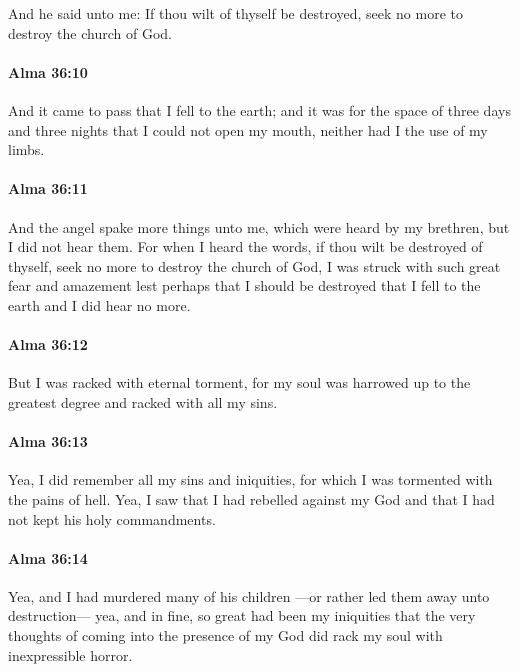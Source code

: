 			And he said unto me:
			If thou wilt of thyself be destroyed,
			seek no more to destroy the church of God.

		\paragraph{Alma 36:10} %
			\label{ALMA-36-10}

			And it came to pass that I fell to the earth;
			and it was for the space of three days and three nights
			that I could not open my mouth,
			neither had I the use of my limbs.

		\paragraph{Alma 36:11} %
			\label{ALMA-36-11}

			And the angel spake more things unto me,
			which were heard by my brethren,
			but I did not hear them.
			For when I heard the words,
			if thou wilt be destroyed of thyself,
			seek no more to destroy the church of God,
			I was struck with such great fear and amazement
			lest perhaps that I should be destroyed
			that I fell to the earth and I did hear no more.

		\paragraph{Alma 36:12} %
			\label{ALMA-36-12}

			But I was racked with eternal torment,
			for my soul was harrowed up to the greatest degree
			and racked with all my sins.

		\paragraph{Alma 36:13} %
			\label{ALMA-36-13}

			Yea, I did remember all my sins and iniquities,
			for which I was tormented with the pains of hell.
			Yea, I saw that I had rebelled against my God
			and that I had not kept his holy commandments.

		\paragraph{Alma 36:14} %
			\label{ALMA-36-14}

			Yea, and I had murdered many of his children
			---or rather led them away unto destruction---
			yea, and in fine, so great had been my iniquities
			that the very thoughts of coming into the presence of my God
			did rack my soul with inexpressible horror.

